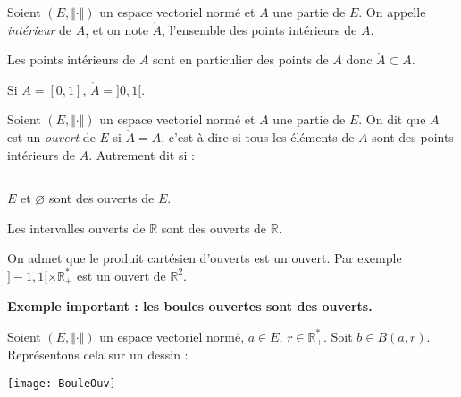 \documentclass[a4paper,10pt]{report}
\begin{document}
\begin{defin} Soient $(E, \Vert \cdot \Vert)$ un espace vectoriel normé et $A$ une partie de $E$. On appelle \textit{intérieur} de $A$, et on note $\mathring{A}$, l'ensemble des points intérieurs de $A$.
\end{defin}

\begin{rem} Les points intérieurs de $A$ sont en particulier des points de $A$ donc $\mathring{A} \subset A$.
\end{rem}

\begin{ex} Si $A=[0,1]$, $\mathring{A} = ]0,1[$.
\end{ex}

\begin{defin}
Soient $(E, \Vert \cdot \Vert)$ un espace vectoriel normé et $A$ une partie de $E$. On dit que $A$ est un \textit{ouvert} de $E$ si $\mathring{A}=A$, c'est-à-dire si tous les éléments de $A$ sont des points intérieurs de $A$. Autrement dit si :
$$ \phantom{\forall a \in A, \, \exists r>0 \, \vert \, B(a,r) \subset A}$$
\end{defin}
%

\begin{exems}
\item $E$ et $\varnothing$ sont des ouverts de $E$.
\item Les intervalles ouverts de $\mathbb{R}$ sont des ouverts de $\mathbb{R}$.
\item On admet que le produit cartésien d'ouverts est un ouvert. Par exemple $]-1,1[ \times \mathbb{R}_{+}^*$ est un ouvert de $\mathbb{R}^2$.
\end{exems}

\medskip

\noindent \textbf{Exemple important : les boules ouvertes sont des ouverts.}

\noindent Soient $(E, \Vert \cdot \Vert)$ un espace vectoriel normé, $a \in E$, $r \in \mathbb{R}_+^*$. Soit $b \in B(a,r)$. Représentons cela sur un dessin :

\begin{center}
\texttt{[image: BouleOuv]}
\end{center}

\vspace{4cm}
\end{document}
